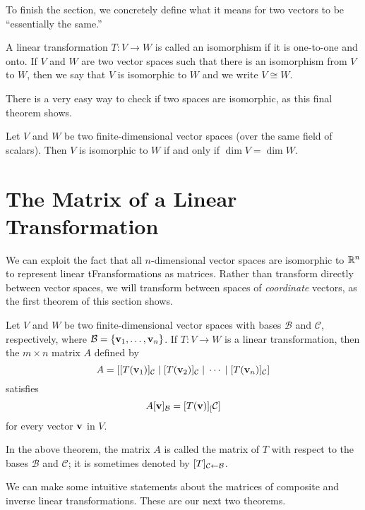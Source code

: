 \documentclass[../m73main.tex]{chapters}
\begin{document}
To finish the section, we concretely define what it means for two vectors to be ``essentially the same.''

\begin{definition}[Isomorphism]
	A linear transformation $T : V \to W$ is called an isomorphism if it is one-to-one and onto.
	If $V$ and $W$ are two vector spaces such that there is an isomorphism from $V$ to $W$, then we say that $V$ is isomorphic to $W$ and we write $V \cong W$.
\end{definition}

There is a very easy way to check if two spaces are isomorphic, as this final theorem shows.

\begin{theorem}
	Let $V$ and $W$ be two finite-dimensional vector spaces (over the same field of scalars).
	Then $V$ is isomorphic to $W$ if and only if $\dim V = \dim W$.
\end{theorem}

\section{The Matrix of a Linear Transformation}
We can exploit the fact that all $n$-dimensional vector spaces are isomorphic to $\mathbb{R}^n$ to represent linear tFransformations as matrices.
Rather than transform directly between vector spaces, we will transform between spaces of \textit{coordinate} vectors, as the first theorem of this section shows.

\begin{theorem}
	Let $V$ and $W$ be two finite-dimensional vector spaces with bases $\mathcal{B}$ and $\mathcal{C}$, respectively, where $\mathcal{B} = \{\mathbf{v}_1, \ldots, \mathbf{v}_n\}$.
	If $T : V \to W$ is a linear transformation, then the $m \times n$ matrix $A$ defined by
	\[ A = [ [T(\mathbf{v}_1)]_{\mathcal{C}} \;|\; [T(\mathbf{v}_2)]_{\mathcal{C}} \;|\; \cdots \;|\; [T(\mathbf{v}_n)]_{\mathcal{C}} ] \]
	satisfies
	\[ A [\mathbf{v}]_{\mathcal{B}} = [T(\mathbf{v})]_[\mathcal{C}] \]
	for every vector $\mathbf{v}$ in $V$.
\end{theorem}

In the above theorem, the matrix $A$ is called the matrix of $T$ with respect to the bases $\mathcal{B}$ and $\mathcal{C}$; it is sometimes denoted by $[T]_{\mathcal{C} \leftarrow \mathcal{B}}$.

We can make some intuitive statements about the matrices of composite and inverse linear transformations.
These are our next two theorems.
\end{document}
